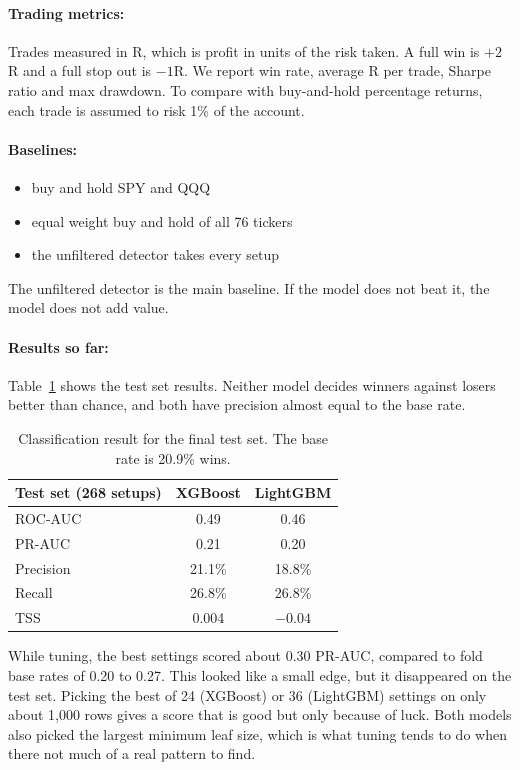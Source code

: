 \documentclass[11pt]{article}
\begin{document}
\paragraph{Trading metrics:} Trades measured in R, which is profit in units of the risk taken. A full win is $+2$R and a full stop out is $-1$R. We report win rate, average R per trade, Sharpe ratio and max drawdown. To compare with buy-and-hold percentage returns, each trade is assumed to risk 1\% of the account.

\paragraph{Baselines:}
\begin{itemize}
  \item buy and hold SPY and QQQ
  \item equal weight buy and hold of all 76 tickers
  \item the unfiltered detector takes every setup
\end{itemize}
The unfiltered detector is the main baseline. If the model does not beat it, the model does not add value.

\paragraph{Results so far:} Table~\ref{tab:test} shows the test set results. Neither model decides winners against losers better than chance, and both have precision almost equal to the base rate.

\begin{table}[t]
  \centering
  \small
  \begin{tabular}{lcc}
    \hline
    \textbf{Test set (268 setups)} & \textbf{XGBoost} & \textbf{LightGBM} \\
    \hline
    ROC-AUC   & 0.49   & 0.46   \\
    PR-AUC    & 0.21   & 0.20   \\
    Precision & 21.1\% & 18.8\% \\
    Recall    & 26.8\% & 26.8\% \\
    TSS       & 0.004  & $-0.04$ \\
    \hline
  \end{tabular}
  \caption{Classification result for the final test set. The base rate is 20.9\% wins.}
  \label{tab:test}
\end{table}

While tuning, the best settings scored about 0.30 PR-AUC, compared to fold base rates of 0.20 to 0.27. This looked like a small edge, but it disappeared on the test set. Picking the best of 24 (XGBoost) or 36 (LightGBM) settings on only about 1,000 rows gives a score that is good but only because of luck. Both models also picked the largest minimum leaf size, which is what tuning tends to do when there not much of a real pattern to find.
\end{document}
